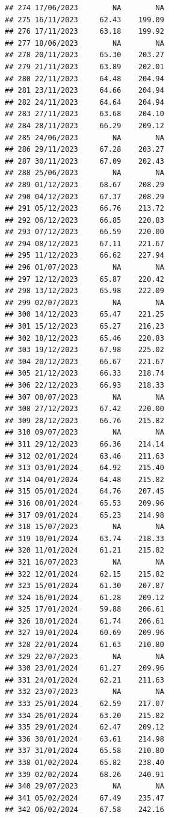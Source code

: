 \documentclass[
]{article}
\begin{document}
\begin{verbatim}
## 274 17/06/2023        NA        NA
## 275 16/11/2023     62.43    199.09
## 276 17/11/2023     63.18    199.92
## 277 18/06/2023        NA        NA
## 278 20/11/2023     65.30    203.27
## 279 21/11/2023     63.89    202.01
## 280 22/11/2023     64.48    204.94
## 281 23/11/2023     64.66    204.94
## 282 24/11/2023     64.64    204.94
## 283 27/11/2023     63.68    204.10
## 284 28/11/2023     66.29    209.12
## 285 24/06/2023        NA        NA
## 286 29/11/2023     67.28    203.27
## 287 30/11/2023     67.09    202.43
## 288 25/06/2023        NA        NA
## 289 01/12/2023     68.67    208.29
## 290 04/12/2023     67.37    208.29
## 291 05/12/2023     66.76    213.72
## 292 06/12/2023     66.85    220.83
## 293 07/12/2023     66.59    220.00
## 294 08/12/2023     67.11    221.67
## 295 11/12/2023     66.62    227.94
## 296 01/07/2023        NA        NA
## 297 12/12/2023     65.87    220.42
## 298 13/12/2023     65.98    222.09
## 299 02/07/2023        NA        NA
## 300 14/12/2023     65.47    221.25
## 301 15/12/2023     65.27    216.23
## 302 18/12/2023     65.46    220.83
## 303 19/12/2023     67.98    225.02
## 304 20/12/2023     66.67    221.67
## 305 21/12/2023     66.33    218.74
## 306 22/12/2023     66.93    218.33
## 307 08/07/2023        NA        NA
## 308 27/12/2023     67.42    220.00
## 309 28/12/2023     66.76    215.82
## 310 09/07/2023        NA        NA
## 311 29/12/2023     66.36    214.14
## 312 02/01/2024     63.46    211.63
## 313 03/01/2024     64.92    215.40
## 314 04/01/2024     64.48    215.82
## 315 05/01/2024     64.76    207.45
## 316 08/01/2024     65.53    209.96
## 317 09/01/2024     65.23    214.98
## 318 15/07/2023        NA        NA
## 319 10/01/2024     63.74    218.33
## 320 11/01/2024     61.21    215.82
## 321 16/07/2023        NA        NA
## 322 12/01/2024     62.15    215.82
## 323 15/01/2024     61.30    207.87
## 324 16/01/2024     61.28    209.12
## 325 17/01/2024     59.88    206.61
## 326 18/01/2024     61.74    206.61
## 327 19/01/2024     60.69    209.96
## 328 22/01/2024     61.63    210.80
## 329 22/07/2023        NA        NA
## 330 23/01/2024     61.27    209.96
## 331 24/01/2024     62.21    211.63
## 332 23/07/2023        NA        NA
## 333 25/01/2024     62.59    217.07
## 334 26/01/2024     63.20    215.82
## 335 29/01/2024     62.47    209.12
## 336 30/01/2024     63.61    214.98
## 337 31/01/2024     65.58    210.80
## 338 01/02/2024     65.82    238.40
## 339 02/02/2024     68.26    240.91
## 340 29/07/2023        NA        NA
## 341 05/02/2024     67.49    235.47
## 342 06/02/2024     67.58    242.16

\end{verbatim}
\end{document}
